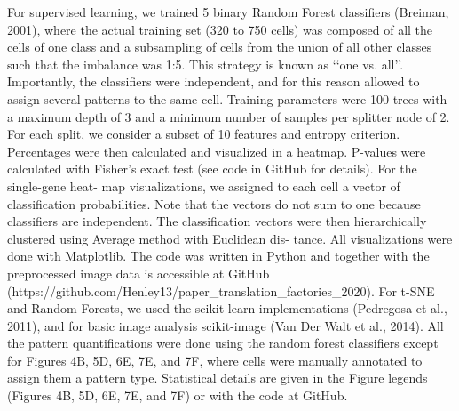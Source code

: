 For supervised learning, we trained 5 binary Random Forest classifiers (Breiman, 2001), where the actual training set (320 to 750 cells) was composed of all the cells of one class and a subsampling of cells from the union of all other classes such that the imbalance was 1:5. This strategy is known as ‘‘one vs. all’’. Importantly, the classifiers were independent, and for this reason allowed to assign several patterns to the same cell. Training parameters were 100 trees with a maximum depth of 3 and a minimum number of samples per splitter node of 2. For each split, we consider a subset of 10 features and entropy criterion. Percentages were then calculated and visualized in a heatmap. P-values were calculated with Fisher’s exact test (see code in GitHub for details). For the single-gene heat- map visualizations, we assigned to each cell a vector of classification probabilities. Note that the vectors do not sum to one because classifiers are independent. The classification vectors were then hierarchically clustered using Average method with Euclidean dis- tance. All visualizations were done with Matplotlib. The code was written in Python and together with the preprocessed image data is accessible at GitHub (https://github.com/Henley13/paper_translation_factories_2020). For t-SNE and Random Forests, we used the scikit-learn implementations (Pedregosa et al., 2011), and for basic image analysis scikit-image (Van Der Walt et al., 2014). All the pattern quantifications were done using the random forest classifiers except for Figures 4B, 5D, 6E, 7E, and 7F, where cells were manually annotated to assign them a pattern type. Statistical details are given in the Figure legends (Figures 4B, 5D, 6E, 7E, and 7F) or with the code at GitHub.

